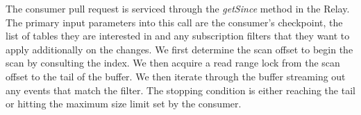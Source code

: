 

The consumer pull request is serviced through the \emph{getSince} method in the Relay. The primary input parameters into this call are the consumer's checkpoint, the list of tables they are interested in and any subscription filters that they want to apply additionally on the changes. We first determine the scan offset to begin the scan by consulting the index. We then acquire a read range lock from the scan offset to the tail of the buffer. We then iterate through the buffer streaming out any events that match the filter. The stopping condition is either reaching the tail or hitting the maximum size limit set by the consumer. 




